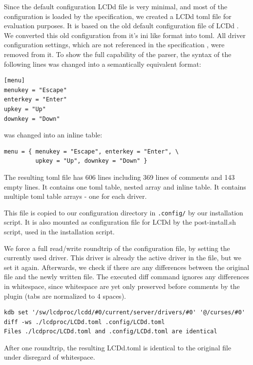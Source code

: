 \documentclass[12pt]{report}
\begin{document}
Since the default configuration LCDd file is very minimal, and most of the configuration is loaded by the specification, we created a LCDd \acrshort{toml} file for evaluation purposes.
It is based on the old default configuration file of LCDd \cite{LCDprocconf}.
We converted this old configuration from it's ini like format into \acrshort{toml}.
All driver configuration settings, which are not referenced in the specification \cite{bauhaus93forklcdprocslcddspec}, were removed from it.
To show the full capability of the parser, the syntax of the following lines was changed into a semantically equivalent format:
\begin{verbatim}
[menu]
menukey = "Escape"
enterkey = "Enter"
upkey = "Up"
downkey = "Down"
\end{verbatim}
was changed into an inline table:
\begin{verbatim}
menu = { menukey = "Escape", enterkey = "Enter", \
		 upkey = "Up", downkey = "Down" }
\end{verbatim}

The resulting \acrshort{toml} file has 606 lines including 369 lines of comments and 143 empty lines.
It contains one \acrshort{toml} table, nested array and inline table.
It contains multiple \acrshort{toml} table arrays - one for each driver.

This file is copied to our configuration directory in \texttt{.config/} by our installation script.
It is also mounted as configuration file for LCDd by the post-install.sh script, used in the installation script.

We force a full read/write roundtrip of the configuration file, by setting the currently used driver. This driver is already the active driver in the file, but we set it again.
Afterwards, we check if there are any differences between the original file and the newly written file.
The executed diff command ignores any differences in whitespace, since whitespace are yet only preserved before comments by the plugin (tabs are normalized to 4 spaces).
{\small
\begin{verbatim}
kdb set '/sw/lcdproc/lcdd/#0/current/server/drivers/#0' '@/curses/#0'
diff -ws ./lcdproc/LCDd.toml .config/LCDd.toml
Files ./lcdproc/LCDd.toml and .config/LCDd.toml are identical
\end{verbatim}
}
After one roundtrip, the resulting LCDd.toml is identical to the original file under disregard of whitespace.
\\\\
\end{document}
